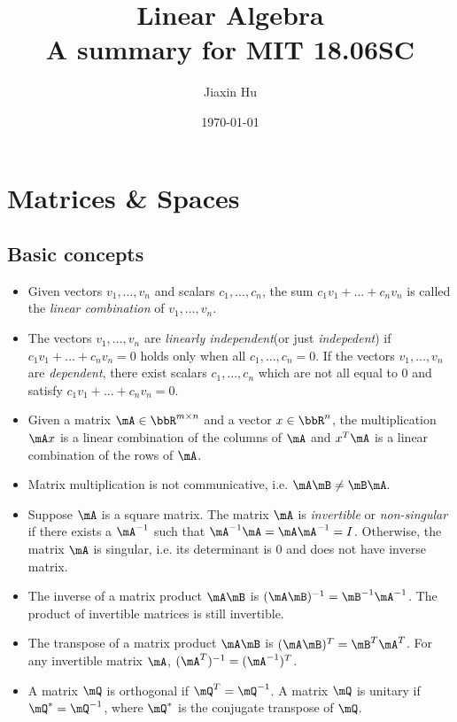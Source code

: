 \documentclass[11pt]{article}
\title{\textbf{Linear Algebra}\\A summary for MIT 18.06SC}
\date{\today}
\author{%
Jiaxin Hu
}
\theoremstyle{plain}
\theoremstyle{definition}
\begin{document}

\maketitle


\section{Matrices \& Spaces}
\subsection{Basic concepts}
\begin{itemize}
    \item Given vectors $v_1 ,...,v_n$ and scalars $c_1, ..., c_n$, the sum $c_1 v_1 + \dots + c_n v_n$ is called the \textit{linear combination} of $v_1,...,v_n$.
    \item The vectors  $v_1 ,...,v_n$  are \textit{linearly independent}(or just \textit{indepedent}) if $c_1 v_1 + \dots + c_n v_n = 0$ holds only when all  $c_1,...,c_n = 0$. If the vectors  $v_1 ,...,v_n$  are \textit{dependent}, there exist scalars $c_1, ..., c_n$ which are not all equal to 0 and satisfy $c_1 v_1 + \dots + c_n v_n = 0$.
	\item Given a matrix $\mA \in \bbR^{m \times n}$ and a vector $x \in \bbR^{n}$,  the multiplication $\mA x$ is a linear combination of the columns of $\mA$ and $x^T \mA$ is a linear combination of the rows of $\mA$.
	\item Matrix multiplication is not communicative, i.e. $\mA \mB \neq \mB \mA.$ 
	\item Suppose $\mA$ is a square matrix. The matrix $\mA$ is \textit{invertible} or \textit{non-singular} if there exists a $\mA^{-1}$ such that $\mA^{-1} \mA = \mA \mA^{-1} = I$. Otherwise, the matrix $\mA$ is singular, i.e. its determinant is 0 and does not have inverse matrix. 
	\item The inverse of a matrix product $\mA\mB$ is $(\mA \mB)^{-1} = \mB^{-1} \mA^{-1}$. The product of invertible matrices is still invertible.
	\item The transpose of a matrix product  $\mA\mB$ is $(\mA \mB)^{T} = \mB^{T} \mA^{T}$. For any invertible matrix $\mA$, $(\mA^T)^{-1} = (\mA^{-1})^T$.
	\item A matrix $\mQ$ is orthogonal if $\mQ^T = \mQ^{-1}$. A matrix $\mQ$ is unitary if $\mQ^* = \mQ^{-1}$, where $\mQ^*$ is the conjugate transpose of $\mQ$.
\end{itemize}
\end{document}

